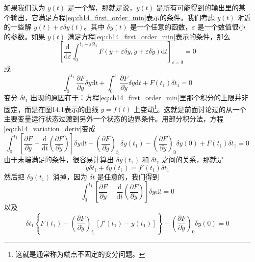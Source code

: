如果我们认为 $y(t)$ 是一个解，那就是说，$y(t)$ 是所有可能得到的输出里的某个输出，它满足方程\eqref{eq:ch14_first_order_min}表示的条件。我们考虑 $y(t)$ 附近的一些解 $y(t) + \varepsilon \delta y(t)$。其中 $\delta y(t)$ 是一个任意的函数，$\varepsilon$ 是一个数值很小的参数。如果 $y(t)$ 满足方程\eqref{eq:ch14_first_order_min}表示的条件，那么
\begin{equation*}
\left[ \frac{\mathrm{d}}{\mathrm{d}\varepsilon} \int_{0}^{t_1 + \varepsilon \delta t_1} F(y + \varepsilon \delta y, \dot{y} + \varepsilon \delta \dot{y}) \mathrm{d}t \right]_{\varepsilon=0} = 0
\end{equation*}
或
\begin{equation}
\int_{0}^{t_1} \frac{\partial F}{\partial y} \delta y \mathrm{d}t + \int_{0}^{t_1} \frac{\partial F}{\partial \dot{y}} \delta \dot{y} \mathrm{d}t + F(t_1) \delta t_1 = 0
\label{eq:ch14_variation_deriv}
\end{equation}
变分 $\delta t_1$ 出现的原因在于：方程\eqref{eq:ch14_first_order_min}里那个积分的上限并非固定，而是在图14.1表示的曲线 $y = f(t)$ 上变动\footnote{这就是通常称为端点不固定的变分问题。}。这就是前面讨论过的从一个主要变量运行状态过渡到另外一个状态的边界条件。用部分积分法，方程\eqref{eq:ch14_variation_deriv}变成
\begin{equation*}
\int_{0}^{t_1} \left[ \frac{\partial F}{\partial y} - \frac{\mathrm{d}}{\mathrm{d}t} \left( \frac{\partial F}{\partial \dot{y}} \right) \right] \delta y \mathrm{d}t + \left( \frac{\partial F}{\partial \dot{y}} \right)_{t_1} \delta y(t_1) - \left( \frac{\partial F}{\partial \dot{y}} \right)_0 \delta y(0) + F(t_1) \delta t_1 = 0
\end{equation*}
由于末端满足的条件，很容易计算出 $\delta y(t_1)$ 和 $\delta t_1$ 之间的关系，那就是
\begin{equation*}
\dot{y} \delta t_1 + \delta y(t_1) = f'(t_1) \delta t_1
\end{equation*}
然后把 $\delta y(t_1)$ 消掉，因为 $\delta t$ 是任意的，我们得到
\begin{equation}
\int_{0}^{t_1} \left[ \frac{\partial F}{\partial y} - \frac{\mathrm{d}}{\mathrm{d}t} \left( \frac{\partial F}{\partial \dot{y}} \right) \right] \delta y \mathrm{d}t = 0
\label{eq:ch14_variation_int_zero}
\end{equation}
以及
\begin{equation}
\delta t_1 \left\{ F(t_1) + \left( \frac{\partial F}{\partial \dot{y}} \right)_{t_1} \left[ f'(t_1) - \dot{y}(t_1) \right] \right\} - \left( \frac{\partial F}{\partial \dot{y}} \right)_0 \delta y(0) = 0
\label{eq:ch14_variation_boundary}
\end{equation}
